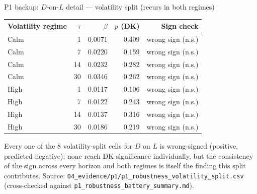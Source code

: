 \documentclass[aspectratio=169]{beamer}
\begin{document}
\begin{frame}{P1 backup: $D$-on-$L$ detail --- volatility split (recurs in both regimes)}
  \footnotesize
  \begin{center}
  \begin{tabular}{@{}l r r r r@{}}
    \toprule
    Volatility regime & $\tau$ & $\beta$ & $p$ (DK) & Sign check \\
    \midrule
    Calm & 1  & 0.0071 & 0.409 & wrong sign (n.s.) \\
    Calm & 7  & 0.0220 & 0.159 & wrong sign (n.s.) \\
    Calm & 14 & 0.0232 & 0.282 & wrong sign (n.s.) \\
    Calm & 30 & 0.0346 & 0.262 & wrong sign (n.s.) \\
    High & 1  & 0.0117 & 0.106 & wrong sign (n.s.) \\
    High & 7  & 0.0122 & 0.243 & wrong sign (n.s.) \\
    High & 14 & 0.0137 & 0.316 & wrong sign (n.s.) \\
    High & 30 & 0.0186 & 0.219 & wrong sign (n.s.) \\
    \bottomrule
  \end{tabular}
  \end{center}
  \vspace{0.5em}
  Every one of the 8 volatility-split cells for $D$ on $L$ is wrong-signed (positive, predicted negative); none reach DK significance individually, but the consistency of the sign across every horizon and both regimes is itself the finding this split contributes.
  {\scriptsize Source: \texttt{04\_evidence/p1/p1\_robustness\_volatility\_split.csv} (cross-checked against \texttt{p1\_robustness\_battery\_summary.md}).}
\end{frame}
\end{document}
